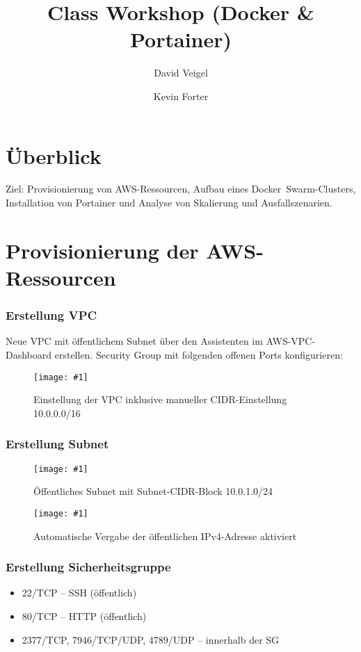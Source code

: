\documentclass[BMR,Seminar,ngerman,IEEE]{twbook}
\title{Class Workshop (Docker \& Portainer)}
\author{David Veigel \and Kevin Forter}
\newcommand{\screenshotH}[3]{%
  \begin{figure}[H]
    \centering
    \texttt{[image: \#1]}%
    \caption{#2}%
    \label{fig:#3}%
  \end{figure}%
}
\begin{document}
\maketitle

\onecolumn
\newpage

\chapter{Überblick}
Ziel: Provisionierung von AWS-Ressourcen, Aufbau eines Docker~Swarm-Clusters, Installation von Portainer und Analyse von Skalierung und Ausfallszenarien.

\chapter{Provisionierung der AWS-Ressourcen}
\subsection{Erstellung VPC}
Neue VPC mit öffentlichem Subnet über den Assistenten im AWS-VPC-Dashboard erstellen. Security Group mit folgenden offenen Ports konfigurieren:
\screenshotH{vpc_configuration.png}{Einstellung der VPC inklusive manueller CIDR-Einstellung 10.0.0.0/16}{vpc-overview}
\FloatBarrier

\subsection{Erstellung Subnet}
\screenshotH{subnetsettings.png}{Öffentliches Subnet mit Subnet-CIDR-Block 10.0.1.0/24}{subnet-overview}
\FloatBarrier
\screenshotH{auto_public_ipv4.png}{Automatische Vergabe der öffentlichen IPv4-Adresse aktiviert}{auto-public-ipv4}
\FloatBarrier

\subsection{Erstellung Sicherheitsgruppe}
\begin{itemize}[leftmargin=*]
  \item 22/TCP – SSH (öffentlich)
  \item 80/TCP – HTTP (öffentlich)
  \item 2377/TCP, 7946/TCP/UDP, 4789/UDP – innerhalb der SG
\end{itemize}
\end{document}
